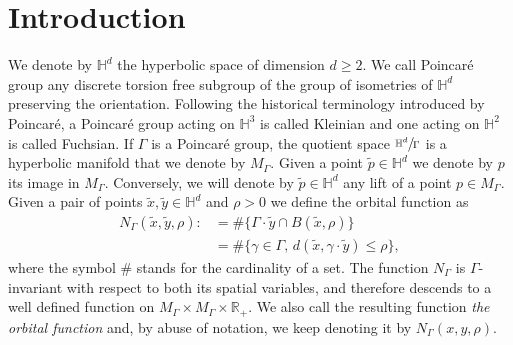 \documentclass[JEP,XML,SOM,Unicode,NoFloatCountersInSection,published]{cedram}
\theoremstyle{plain}
\theoremstyle{definition}
\newcommand{\HH}{\mathbb{H}}
\newcommand{\RR}{\mathbb{R}}
\let\quotient\sfrac
\begin{document}
\section{Introduction}
We denote by $\HH^d$ the hyperbolic space of dimension $d \ge 2$. We call Poincaré group any discrete torsion free subgroup of the group of isometries of $\HH^d$ preserving the orientation. Following the historical terminology introduced by Poincaré, a Poincaré group acting on $\HH^3$ is called Kleinian and one acting on $\HH^2$ is called Fuchsian. If $\Gamma$ is a Poincaré group, the quotient space $\quotient{\HH^d}{\Gamma}$ is a hyperbolic manifold that we denote by $M_{\Gamma}$. Given a point $\tilde{p} \in \HH^d$ we denote by $p$ its image in $M_{\Gamma}$. Conversely, we will denote by $\tilde{p} \in \HH^d$ any lift of a point $p \in M_{\Gamma}$. Given a pair of points $\tilde{x},\tilde{y} \in \HH^d$ and $\rho > 0$ we define the orbital function as
\begin{align*}
N_{\Gamma}(\tilde{x},\tilde{y},\rho) : & = \# \{ \Gamma \cdot \tilde{y} \cap B(\tilde{x}, \rho) \} \\
& = \# \{ \gamma \in \Gamma, \,d(\tilde{x}, \gamma \cdot \tilde{y}) \le \rho \},
\end{align*}
where the symbol $\#$ stands for the cardinality of a set. The function $N_{\Gamma}$ is $\Gamma$-invariant with respect to both its spatial variables, and therefore descends to a well defined function on $M_{\Gamma} \times M_{\Gamma} \times \RR_+$. We also call the resulting function \emph{the orbital function} and, by abuse of notation, we keep denoting it by $N_{\Gamma}(x,y,\rho)$.
\end{document}
